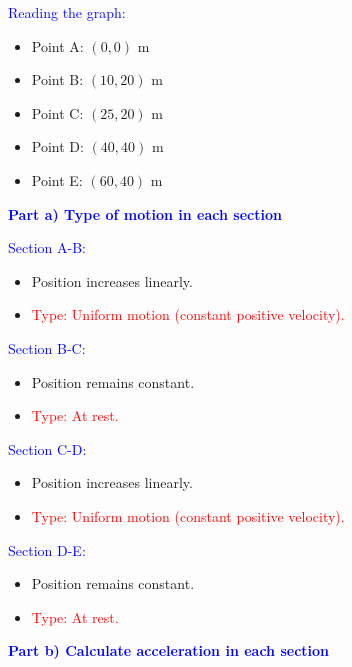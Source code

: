 \begin{exercise}
\begin{solu}
        \vspace{0.3cm}

        \textcolor{blue}{Reading the graph:}
        \begin{itemize}
            \item Point A: $(0,0)$ m
            \item Point B: $(10,20)$ m
            \item Point C: $(25,20)$ m
            \item Point D: $(40,40)$ m
            \item Point E: $(60,40)$ m
        \end{itemize}

        \textbf{\textcolor{blue}{Part a) Type of motion in each section}}

        \textcolor{blue}{Section A-B:}
        \begin{itemize}
            \item Position increases linearly.
            \item \textcolor{red}{Type: Uniform motion (constant positive velocity).}
        \end{itemize}

        \textcolor{blue}{Section B-C:}
        \begin{itemize}
            \item Position remains constant.
            \item \textcolor{red}{Type: At rest.}
        \end{itemize}

        \textcolor{blue}{Section C-D:}
        \begin{itemize}
            \item Position increases linearly.
            \item \textcolor{red}{Type: Uniform motion (constant positive velocity).}
        \end{itemize}

        \textcolor{blue}{Section D-E:}
        \begin{itemize}
            \item Position remains constant.
            \item \textcolor{red}{Type: At rest.}
        \end{itemize}

        \vspace{0.5cm}

        \textbf{\textcolor{blue}{Part b) Calculate acceleration in each section}}


\end{solu}
\end{exercise}
